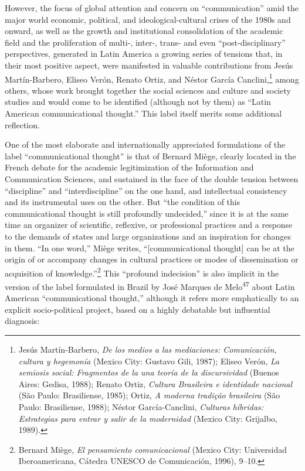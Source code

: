 \documentclass{tufte-handout}
\begin{document}
However, the focus of global attention and concern on ``communication''
amid the major world economic, political, and ideological-cultural
crises of the 1980s and onward, as well as the growth and institutional
consolidation of the academic field and the proliferation of multi-,
inter-, trans- and even ``post-disciplinary'' perspectives, generated in
Latin America a growing series of tensions that, in their most positive
aspect, were manifested in valuable contributions from Jesús
Martín-Barbero, Eliseo Verón, Renato Ortiz, and Néstor García
Canclini,\footnote{Jesús Martín-Barbero, \emph{De los medios a las
  mediaciones: Comunicación, cultura y hegemonía} (Mexico City: Gustavo
  Gili, 1987); Eliseo Verón, \emph{La semiosis social: Fragmentos de la
  una teoría de la discursividad} (Buenos Aires: Gedisa, 1988); Renato
  Ortiz, \emph{Cultura Brasileira e identidade nacional} (São Paulo:
  Brasiliense, 1985); Ortiz, \emph{A moderna tradição brasileira} (São
  Paulo: Brasiliense, 1988); Néstor García-Canclini, \emph{Culturas
  híbridas: Estrategias para entrar y salir de la modernidad} (Mexico
  City: Grijalbo, 1989).} among others, whose work brought together the
social sciences and culture and society studies and would come to be
identified (although not by them) as ``Latin American communicational
thought.'' This label itself merits some additional reflection.

One of the most elaborate and internationally appreciated formulations
of the label ``communicational thought'' is that of Bernard Miège,
clearly located in the French debate for the academic legitimization of
the Information and Communication Sciences, and sustained in the face of
the double tension between ``discipline'' and ``interdiscipline'' on the
one hand, and intellectual consistency and its instrumental uses on the
other. But ``the condition of this communicational thought is still
profoundly undecided,'' since it is at the same time an organizer of
scientific, reflexive, or professional practices and a response to the
demands of states and large organizations and an inspiration for changes
in them. ``In one word,'' Miège writes, ``{[}communicational thought{]}
can be at the origin of or accompany changes in cultural practices or
modes of dissemination or acquisition of knowledge.''\footnote{Bernard
  Miège, \emph{El pensamiento comunicacional} (Mexico City: Universidad
  Iberoamericana, Cátedra UNESCO de Comunicación, 1996), 9--10.} This
``profound indecision'' is also implicit in the version of the label
formulated in Brazil by José Marques de Melo\textsuperscript{47} about
Latin American ``communicational thought,'' although it refers more
emphatically to an explicit socio-political project, based on a highly
debatable but influential diagnosis:
\end{document}
